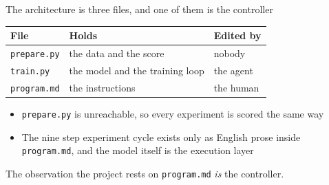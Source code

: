 \documentclass[aspectratio=169,11pt]{beamer}
\newcommand{\prog}{\texttt{program.md}}
\begin{document}
\begin{frame}{The architecture is three files, and one of them is the controller}
  \begin{center}
  \small
  \begin{tabular}{@{}lll@{}}
    \toprule
    \textbf{File} & \textbf{Holds} & \textbf{Edited by}\\
    \midrule
    \texttt{prepare.py} & the data and the score          & nobody\\
    \texttt{train.py}   & the model and the training loop & the agent\\
    \texttt{\prog}      & the instructions                & the human\\
    \bottomrule
  \end{tabular}
  \end{center}
  \vfill
  \begin{itemize}
    \item \texttt{prepare.py} is unreachable, so every experiment is scored
          the same way
    \item The nine step experiment cycle exists only as English prose inside
          \texttt{\prog}, and the model itself is the execution layer
  \end{itemize}
  \vfill
  \begin{block}{The observation the project rests on}
    \texttt{\prog} \emph{is}
    the controller.
  \end{block}
\end{frame}
\end{document}
